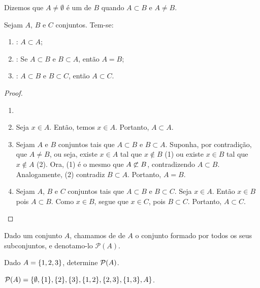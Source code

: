 \begin{definition}
Dizemos que $A \neq \emptyset$ é um  de $B$ quando $A \subset B$ e $A \neq B$.
\end{definition}

\begin{proposition}
Sejam $A$, $B$ e $C$ conjuntos. Tem-se:
%
\begin{enumerate}
\item {}: $A \subset A$;
\item {}: Se $A \subset B$ e $B \subset A$, então $A = B$;
\item {}: $A \subset B$ e $B \subset C$, então $A \subset C$.
\end{enumerate}
\end{proposition}

\begin{proof}
\begin{enumerate}
	\item[] 
	\item Seja $x \in A$. Então, temos $x \in A$. Portanto, $A \subset A$.
	\item Sejam $A$ e $B$ conjuntos tais que $A \subset B$ e $B \subset A$. Suponha, por contradição, que $A \ne B$, ou seja, existe $x \in A$ tal que $x \notin B$ (1) ou existe $x \in B$ tal que $x \notin A$ (2). Ora, (1) é o mesmo que $A \not\subset B$, contradizendo $A \subset B$. Analogamente, (2) contradiz $B \subset A$. Portanto, $A = B$.
	\item Sejam $A$, $B$ e $C$ conjuntos tais que $A \subset B$ e $B \subset C$. Seja $x \in A$. Então $x \in B$ pois $A \subset B$. Como $x \in B$, segue que $x \in C$, pois $B \subset C$. Portanto, $A \subset C$.
\end{enumerate}
\end{proof}

\begin{definition}
Dado um conjunto $A$, chamamos de  de $A$ o conjunto formado por todos os seus subconjuntos, e denotamo-lo $\mathcal{P}(A)$.
\end{definition}

\begin{example}
Dado $A = \left\{1,2,3\right\}$, determine $\mathcal{P}(A)$.
\end{example}

\begin{solution}
$\mathcal{P}(A)=\{\emptyset,\{1\}, \{2\}, \{3\}, \{1,2\}, \{2,3\}, \{1,3\},A\}$.
\end{solution}